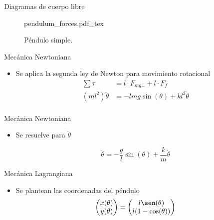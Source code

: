\documentclass{beamer}
\begin{document}
\begin{frame}{Diagramas de cuerpo libre}
 \begin{figure}[ht]
    \centering
    {pendulum_forces.pdf_tex}
    \caption{Péndulo simple.}
    \label{fig: simple pendulum forces}
\end{figure}
\end{frame}

\begin{frame}{Mecánica Newtoniana}

\begin{itemize}
 \item Se aplica la segunda ley de Newton para movimiento rotacional
 \begin{equation}
\begin{split}
 \sum \tau &= l \cdot F_{mg\bot}  + l \cdot F_f\\
 (m l^2) \ddot{\theta} & = - l m g \sin(\theta)  + k l^2 \dot{\theta}\\
 \end{split}
 \label{eq: sum of moments magnitude}
\end{equation}

\end{itemize}

\end{frame}

\begin{frame}{Mecánica Newtoniana}
\begin{itemize}
 \item Se resuelve para $\ddot{\theta}$
 
 \begin{equation}
\ddot{\theta} = - \dfrac{g}{l} \sin(\theta) + \dfrac{k}{m} \dot{\theta}  
 \end{equation}

\end{itemize}
\end{frame}

\begin{frame}{Mecánica Lagrangiana}
 \begin{itemize}
  \item Se plantean las coordenadas del péndulo
  \begin{equation}
\begin{pmatrix}
x(\theta)\\
y(\theta)
\end{pmatrix}
= 
\begin{pmatrix}
l\sen(\theta)\\
l(1 - \cos(\theta))
\end{pmatrix}
\label{eq: lagrange position coordinates}
\end{equation}
 \end{itemize}
\end{frame}
\end{document}
